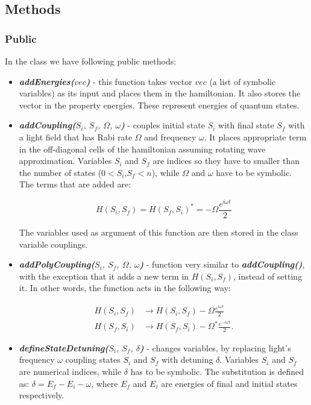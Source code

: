 \documentclass{article}
\numberwithin{equation}{section}
\numberwithin{figure}{section}
\numberwithin{table}{section}
\newcommand\codefun[2]{\textit{\textbf{#1(}#2\textbf{)}}}
\newcommand\codevar[1]{\ttfamily #1\rmfamily}
\begin{document}
\subsection*{Methods}

\subsubsection*{Public}

In the class we have following public methods:

\begin{itemize}

\item \codefun{addEnergies}{$vec$} - this function takes vector $vec$ (a list of symbolic variables) as its input and places them in the hamiltonian. It also stores the vector in the property \codevar{energies}. These represent energies of quantum states.

\item \codefun{addCoupling}{$S_i$, $S_f$, $\Omega$, $\omega$} - couples initial state $S_i$ with final state $S_f$ with a light field that has Rabi rate $\Omega$ and frequency $\omega$. It places appropriate term in the off-diagonal cells of the hamiltonian assuming rotating wave approximation. Variables $S_i$ and $S_f$ are indices so they have to smaller than the number of states ($0<S_i$,$S_f<n$), while $\Omega$ and $\omega$ have to be symbolic. The terms that are added are:

\begin{displaymath}
H(S_i,S_f)=H(S_f,S_i)^*=-\Omega\frac{e^{i\omega t}}{2}
\end{displaymath}

\noindent The variables used as argument of this function are then stored in the class variable \codevar{couplings}.

\item \codefun{addPolyCoupling}{$S_i$, $S_f$, $\Omega$, $\omega$} - function very similar to \codefun{addCoupling}{}, with the exception that it adds a new term in $H(S_i,S_f)$, instead of setting it. In other words, the function acts in the following way:

\begin{align*}
H(S_i,S_f)&\rightarrow H(S_i,S_f)-\Omega\frac{e^{i\omega t}}{2}\\
H(S_f,S_i)&\rightarrow H(S_f,S_i)-\Omega^*\frac{e^{-i\omega t}}{2}.
\end{align*}

\item \codefun{defineStateDetuning}{$S_i$, $S_f$, $\delta$} - changes variables, by replacing light's frequency $\omega$ coupling states $S_i$ and $S_f$ with detuning $\delta$. Variables $S_i$ and $S_f$ are numerical indices, while $\delta$ has to be symbolic. The substitution is defined as: $\delta=E_f-E_i-\omega$, where $E_f$ and $E_i$ are energies of final and initial states respectively.


\end{itemize}
\end{document}
